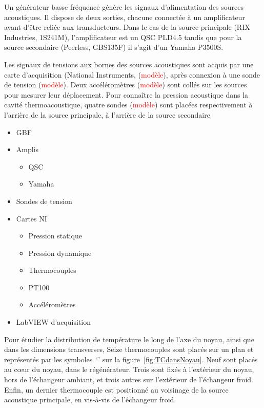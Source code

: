 Un générateur basse fréquence génère les signaux d'alimentation des sources acoustiques. Il dispose de deux sorties, chacune connectée à un amplificateur avant d'être reliée aux transducteurs. Dans le cas de la source principale (RIX Industries, 1S241M), l'amplificateur est un QSC PLD4.5 tandis que pour la source secondaire (Peerless, GBS135F) il s'agit d'un Yamaha P3500S.

Les signaux de tensions aux bornes des sources acoustiques sont acquis par une carte d'acquisition (National Instruments, (\textcolor{red}{modèle}), après connexion à une sonde de tension (\textcolor{red}{modèle}). Deux accéléromètres (\textcolor{red}{modèle}) sont collés sur les sources pour mesurer leur déplacement. Pour connaître la pression acoustique dans la cavité thermoacoustique, quatre sondes (\textcolor{red}{modèle}) sont placées respectivement à l'arrière de la source principale, à l'arrière de la source secondaire 


%    

\begin{itemize}
    \item GBF
    \item Amplis
    \begin{itemize}
        \item QSC
        \item Yamaha
    \end{itemize}
    \item Sondes de tension
    \item Cartes NI
    \begin{itemize}
        \item Pression statique
        \item Pression dynamique
        \item Thermocouples
        \item PT100
        \item Accéléromètres
    \end{itemize}
    \item LabVIEW d'acquisition
\end{itemize}

Pour étudier la distribution de température le long de l'axe du noyau, ainsi que dans les dimensions transverses, Seize thermocouples sont placés sur un plan et représentés par les symboles~`\textcolor{cyan}{\textbullet}' sur la figure~\ref{fig:TCdansNoyau}. Neuf sont placés au c\oe{}ur du noyau, dans le régénérateur. Trois sont fixés à l'extérieur du noyau, hors de l'échangeur ambiant, et trois autres sur l'extérieur de l'échangeur froid. Enfin, un dernier thermocouple est positionné au voisinage de la source acoustique principale, en vis-à-vis de l'échangeur froid.


